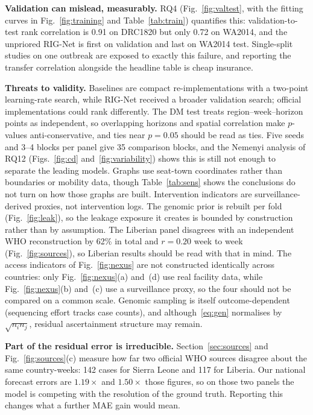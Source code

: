 \documentclass[conference]{IEEEtran}
\begin{document}
\textbf{Validation can mislead, measurably.} RQ4 (Fig.~\ref{fig:valtest}, with the fitting curves in Fig.~\ref{fig:training} and Table~\ref{tab:train}) quantifies this: validation-to-test rank correlation is 0.91 on DRC1820 but only 0.72 on WA2014, and the unpriored RIG-Net is first on validation and last on WA2014 test. Single-split studies on one outbreak are exposed to exactly this failure, and reporting the transfer correlation alongside the headline table is cheap insurance.

\textbf{Threats to validity.} Baselines are compact re-implementations with a two-point learning-rate search, while RIG-Net received a broader validation search; official implementations could rank differently. The DM test treats region--week--horizon points as independent, so overlapping horizons and spatial correlation make $p$-values anti-conservative, and ties near $p=0.05$ should be read as ties. Five seeds and 3--4 blocks per panel give 35 comparison blocks, and the Nemenyi analysis of RQ12 (Figs.~\ref{fig:cd} and~\ref{fig:variability}) shows this is still not enough to separate the leading models. Graphs use seat-town coordinates rather than boundaries or mobility data, though Table~\ref{tab:sens} shows the conclusions do not turn on how those graphs are built. Intervention indicators are surveillance-derived proxies, not intervention logs. The genomic prior is rebuilt per fold (Fig.~\ref{fig:leak}), so the leakage exposure it creates is bounded by construction rather than by assumption. The Liberian panel disagrees with an independent WHO reconstruction by 62\% in total and $r=0.20$ week to week (Fig.~\ref{fig:sources}), so Liberian results should be read with that in mind. The access indicators of Fig.~\ref{fig:nexus} are not constructed identically across countries: only Fig.~\ref{fig:nexus}(a) and~(d) use real facility data, while Fig.~\ref{fig:nexus}(b) and~(c) use a surveillance proxy, so the four should not be compared on a common scale. Genomic sampling is itself outcome-dependent (sequencing effort tracks case counts), and although~\eqref{eq:gen} normalises by $\sqrt{n_in_j}$, residual ascertainment structure may remain.

\textbf{Part of the residual error is irreducible.} Section~\ref{sec:sources} and Fig.~\ref{fig:sources}(c) measure how far two official WHO sources disagree about the same country-weeks: 142 cases for Sierra Leone and 117 for Liberia. Our national forecast errors are $1.19\times$ and $1.50\times$ those figures, so on those two panels the model is competing with the resolution of the ground truth. Reporting this changes what a further MAE gain would mean.
\end{document}
